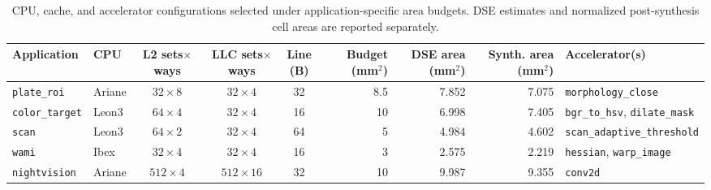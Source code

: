 
\begin{table}[t]
\centering
\caption{CPU, cache, and accelerator configurations selected under application-specific area budgets. DSE estimates and normalized post-synthesis cell areas are reported separately.}
\label{tab:selected_soc_configs}
\footnotesize
\renewcommand{\arraystretch}{1.15}
\setlength{\tabcolsep}{2.5pt}

\begin{tabularx}{0.85\linewidth}{@{}llcccrrr>{\raggedright\arraybackslash}X@{}}
\toprule
\textbf{Application} &
\textbf{CPU} &
\shortstack{\textbf{L2}\\\textbf{sets$\times$ways}} &
\shortstack{\textbf{LLC}\\\textbf{sets$\times$ways}} &
\shortstack{\textbf{Line}\\\textbf{(B)}} &
\shortstack{\textbf{Budget}\\\textbf{(mm$^2$)}} &
\shortstack{\textbf{DSE area}\\\textbf{(mm$^2$)}} &
\shortstack{\textbf{Synth. area}\\\textbf{(mm$^2$)}} &
\textbf{Accelerator(s)} \\
\midrule

\texttt{plate\_roi} &
Ariane &
$32\times8$ &
$32\times4$ &
32 &
8.5 &
7.852 &
7.075 &
\texttt{morphology\_close} \\

\texttt{color\_target} &
Leon3 &
$64\times4$ &
$32\times4$ &
16 &
10 &
6.998 &
7.405 &
\texttt{bgr\_to\_hsv}, \texttt{dilate\_mask} \\

\texttt{scan} &
Leon3 &
$64\times2$ &
$32\times4$ &
64 &
5 &
4.984 &
4.602 &
\texttt{scan\_adaptive\_threshold} \\

\texttt{wami} &
Ibex &
$32\times4$ &
$32\times4$ &
16 &
3 &
2.575 &
2.219 &
\texttt{hessian}, \texttt{warp\_image} \\

\texttt{nightvision} &
Ariane &
$512\times4$ &
$512\times16$ &
32 &
10 &
9.987 &
9.355 &
\texttt{conv2d} \\

\bottomrule
\end{tabularx}
\end{table}

